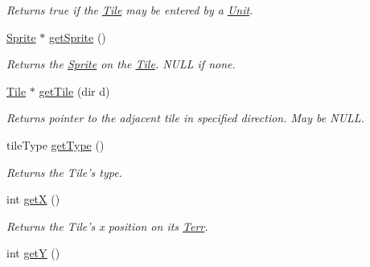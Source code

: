 \begin{DoxyCompactItemize}
\begin{DoxyCompactList}\small\item\em Returns true if the \hyperlink{class_tile}{Tile} may be entered by a \hyperlink{class_unit}{Unit}. \end{DoxyCompactList}\item 
\hyperlink{class_sprite}{Sprite} $\ast$ \hyperlink{class_tile_a42f98bf8592783e96f42d6889a8d7e4f}{get\+Sprite} ()\hypertarget{class_tile_a42f98bf8592783e96f42d6889a8d7e4f}{}\label{class_tile_a42f98bf8592783e96f42d6889a8d7e4f}

\begin{DoxyCompactList}\small\item\em Returns the \hyperlink{class_sprite}{Sprite} on the \hyperlink{class_tile}{Tile}. N\+U\+LL if none. \end{DoxyCompactList}\item 
\hyperlink{class_tile}{Tile} $\ast$ \hyperlink{class_tile_ae5038e62f2a4c28150f6abb4deb31433}{get\+Tile} (dir d)\hypertarget{class_tile_ae5038e62f2a4c28150f6abb4deb31433}{}\label{class_tile_ae5038e62f2a4c28150f6abb4deb31433}

\begin{DoxyCompactList}\small\item\em Returns pointer to the adjacent tile in specified direction. May be N\+U\+LL. \end{DoxyCompactList}\item 
tile\+Type \hyperlink{class_tile_a36871de25627c7483c31807da1c28706}{get\+Type} ()\hypertarget{class_tile_a36871de25627c7483c31807da1c28706}{}\label{class_tile_a36871de25627c7483c31807da1c28706}

\begin{DoxyCompactList}\small\item\em Returns the Tile’s type. \end{DoxyCompactList}\item 
int \hyperlink{class_tile_a25b90e07fd9cdaba1df3ac2a9b6d032b}{getX} ()\hypertarget{class_tile_a25b90e07fd9cdaba1df3ac2a9b6d032b}{}\label{class_tile_a25b90e07fd9cdaba1df3ac2a9b6d032b}

\begin{DoxyCompactList}\small\item\em Returns the Tile’s x position on its \hyperlink{class_terr}{Terr}. \end{DoxyCompactList}\item 
int \hyperlink{class_tile_acf97bff4aac74cc8d7e09bc8ca5afa68}{getY} ()\hypertarget{class_tile_acf97bff4aac74cc8d7e09bc8ca5afa68}{}\label{class_tile_acf97bff4aac74cc8d7e09bc8ca5afa68}


\end{DoxyCompactItemize}
